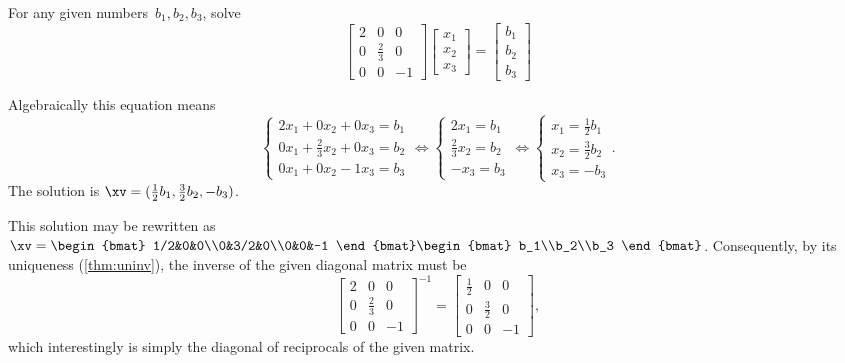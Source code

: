 \begin{example} \label{eg:a3x3inw}
For any given numbers~\(b_1,b_2,b_3\), solve
\begin{equation*}
\begin{bmatrix} 2&0&0\\0&\frac23&0\\0&0&-1 \end{bmatrix}
\begin{bmatrix} x_1\\x_2\\x_3 \end{bmatrix}
=\begin{bmatrix} b_1\\b_2\\b_3 \end{bmatrix}
\end{equation*}
\begin{solution}
Algebraically this equation means
\begin{equation*}
\begin{cases} 2x_1+0x_2+0x_3=b_1
\\0x_1+\frac23x_2+0x_3=b_2
\\0x_1+0x_2-1x_3=b_3\end{cases}
\iff
\begin{cases} 2x_1=b_1
\\\frac23x_2=b_2
\\-x_3=b_3\end{cases}
\iff
\begin{cases} x_1=\frac12b_1 \\ x_2=\frac32b_2 \\ x_3=-b_3\end{cases}.
\end{equation*}
The solution is \(\xv=(\frac12b_1 , \frac32b_2 , -b_3)\).

This solution may be rewritten as
\(\xv=\begin{bmat} 1/2&0&0\\0&3/2&0\\0&0&-1 \end{bmat}
\begin{bmat} b_1\\b_2\\b_3 \end{bmat}\).
Consequently, by its uniqueness (\cref{thm:uninv}), the inverse of the given diagonal matrix must be
\begin{equation*}
\begin{bmatrix} 2&0&0\\0&\frac23&0\\0&0&-1 \end{bmatrix}^{-1}
=\begin{bmatrix} \frac12&0&0\\0&\frac32&0\\0&0&-1 \end{bmatrix},
\end{equation*}
which interestingly is simply the diagonal of reciprocals of the given matrix.
\end{solution}
\end{example}




